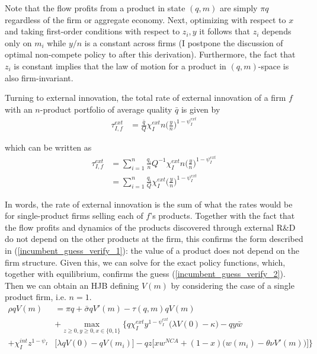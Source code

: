 \documentclass[12pt,english]{article}
\theoremstyle{remark}
\begin{document}
Note that the flow profits from a product in state $(q,m)$ are simply $\pi q$ regardless of the firm or aggregate economy. Next, optimizing with respect to $x$ and taking first-order conditions with respect to $z_i,y$ it follows that $z_i$ depends only on $m_i$ while $y / n$ is a constant across firms (I postpone the discussion of optimal non-compete policy to after this derivation). Furthermore, the fact that $z_i$ is constant implies that the law of motion for a product in $(q,m)$-space is also firm-invariant.

Turning to external innovation, the total rate of external innovation of a firm $f$ with an $n$-product portfolio of average quality $\bar{q}$ is given by
\begin{align}
	\tau_{I,f}^{ext} &= \frac{\bar{q}}{Q} \chi_I^{ext} n \Big(\frac{y}{n}\Big)^{1-\psi_I^{ext}}   
\end{align}

which can be written as
\begin{align}
	\tau_{I,f}^{ext} &=  \sum_{i = 1}^n \frac{q_i}{n} Q^{-1} \chi_I^{ext} n \Big(\frac{y}{n}\Big)^{1-\psi_I^{ext}}  \\
	&= \sum_{i = 1}^n \frac{q_i}{Q} \chi_I^{ext} \Big(\frac{y}{n}\Big)^{1-\psi_I^{ext}}  
\end{align}

In words, the rate of external innovation is the sum of what the rates would be for single-product firms selling each of $f$'s products. Together with the fact that the flow profits and dynamics of the products discovered through external R\&D do not depend on the other products at the firm, this confirms the form described in (\ref{incumbent_guess_verify_1}): the value of a product does not depend on the firm structure. Given this, we can solve for the exact policy functions, which, together with equilibrium, confirms the guess (\ref{incumbent_guess_verify_2}). Then we can obtain an HJB defining $V(m)$ by considering the case of a single product firm, i.e. $n = 1$. 
\begin{align}
	\rho q V(m) &= \pi q + \bar{\sigma} q V'(m)  - \tau(q,m) q V(m) \nonumber \\ 
	& + \max_{z \ge 0, y \ge 0, x \in \{0,1\}} \Bigg\{ q \chi_I^{ext} y^{1-\psi_I^{ext}} \Big( \lambda V(0) - \kappa \Big) - q y \bar{w} \nonumber \\
	+  \chi_I^{int} z^{1-\psi_I} &\Bigg[ \lambda q V(0) - q V(m_i) \Bigg] - qz \Bigg[ x w^{NCA} + (1-x) \Big( w(m_i) - \theta \nu V'(m)\Big) \Bigg] \Bigg\} \label{HJB_I_singleProductFirm_1}
\end{align}
\end{document}
